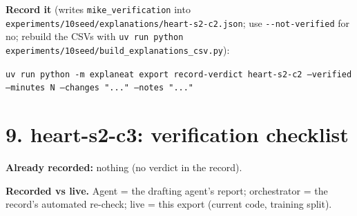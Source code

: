 \documentclass[a4paper,11pt]{article}
\begin{document}
\textbf{Record it} (writes \texttt{mike\_verification} into \texttt{experiments/10seed/explanations/heart-s2-c2.json}; use \texttt{-{}-not-verified} for no; rebuild the CSVs with \texttt{uv run python experiments/10seed/build\_explanations\_csv.py}):

{\footnotesize\raggedright\texttt{uv run python -m explaneat export record-verdict heart-s2-c2 --verified --minutes N --changes "..." --notes "..."}\par}


\clearpage












\clearpage
\section*{9. heart-s2-c3: verification checklist}
\label{rev:heart-s2-c3}
\textbf{Already recorded:} nothing (no verdict in the record).

\textbf{Recorded vs live.} Agent = the drafting agent's report; orchestrator = the record's automated re-check; live = this export (current code, training split).
\end{document}
